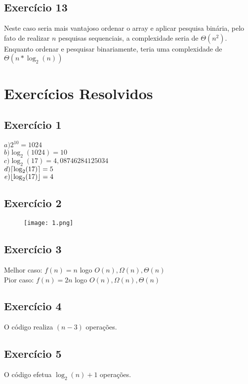 \documentclass[12pt]{article}
\DeclarePairedDelimiter\ceil{\lceil}{\rceil}
\DeclarePairedDelimiter\floor{\lfloor}{\rfloor}
\begin{document}
        \subsection{Exercício 13}
            Neste caso seria mais vantajoso ordenar o array e aplicar pesquisa binária, pelo fato de realizar $n$ pesquisas sequenciais, a complexidade seria de $\Theta(n^2)$.
            Enquanto ordenar e pesquisar binariamente, teria uma complexidade de $\Theta(n*\log_2(n))$


    \section{Exercícios Resolvidos}
        \subsection{Exercício 1}
            \begingroup
                \large
                    $a) 2^{10} = 1024$\\ 
                    $b) \log_{2}(1024) = 10$\\
                    $c) \log_2(17) = 4,08746284125034$\\
                    $d) \ceil*{\log_2(17)} = 5$\\
                    $e) \floor*{\log_2(17)} = 4$
            \endgroup
        \subsection{Exercício 2}
            \begin{figure}[ht]
                \centering
                \texttt{[image: 1.png]}
            \end{figure}
        \subsection{Exercício 3}
            Melhor caso: $f(n) = n$ logo $O(n), \Omega(n), \Theta(n)$\\
            Pior caso: $f(n) = 2n$ logo $O(n), \Omega(n), \Theta(n)$
        \subsection{Exercício 4}
            O código realiza $(n - 3)$ operações.
        \subsection{Exercício 5}
            O código efetua $\log_2(n) + 1$ operações.
\end{document}
